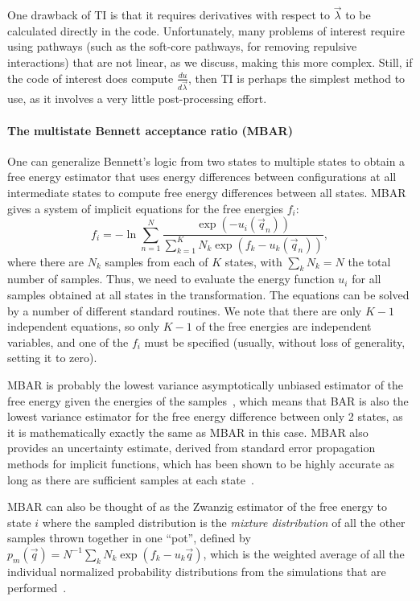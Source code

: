 \documentclass[9pt,bestpractices,pubversion]{livecoms}
\begin{document}
One drawback of TI is that it requires derivatives with respect to $\vec{\lambda}$ to be calculated directly in the code. Unfortunately, many problems of interest require using pathways (such as the soft-core pathways, for removing repulsive interactions) that are not linear, as we discuss, making this more complex. Still, if the code of interest does compute $\frac{du}{d\vec{\lambda}}$, then TI is perhaps the simplest method to use, as it involves a very little post-processing effort.

\paragraph{The multistate Bennett acceptance ratio (MBAR)}
One can generalize Bennett's logic from two states to multiple states to obtain a free energy estimator that uses energy differences between configurations at all intermediate states to compute free energy differences between all states. MBAR gives a system of implicit equations for the free energies $f_i$:
\begin{equation}
f_i = - \ln \sum_{n=1}^{N} \frac{\exp(-u_i(\vec{q}_n))}{\sum_{k=1}^K N_k \exp(f_k-u_k(\vec{q}_n))},
\end{equation}
where there are $N_k$ samples from each of $K$ states, with $\sum_k N_k=N$ the total number of samples. Thus, we need to evaluate the energy function $u_i$ for all samples obtained at all states in the transformation. The equations can be solved by a number of different standard routines. We note that there are only $K-1$ independent equations, so only $K-1$ of the free energies are independent variables, and one of the $f_i$ must be specified (usually, without loss of generality, setting it to zero).

MBAR is probably the lowest variance asymptotically unbiased estimator of the free energy given the energies of the samples~\cite{tan2004likelihood}, which means that BAR is also the lowest variance estimator for the free energy difference between only 2 states, as it is mathematically exactly the same as MBAR in this case. MBAR also provides an uncertainty estimate, derived from standard error propagation methods for implicit functions, which has been shown to be highly accurate as long as there are sufficient samples at each state~\cite{paliwal2011benchmark}.

MBAR can also be thought of as the Zwanzig estimator of the free energy to state $i$ where the sampled distribution is the \textit{mixture distribution} of all the other samples thrown together in one ``pot'', defined by $p_m(\vec{q}) = N^{-1} \sum_k N_k \exp(f_k-u_k\vec{q})$, which is the weighted average of all the individual normalized probability distributions from the simulations that are performed~\cite{shirts2017reweighting}.
\end{document}
